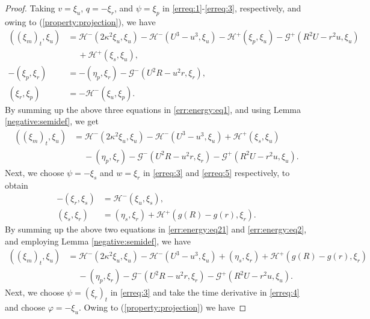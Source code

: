 \documentclass[11pt]{article}
\newcommand{\Hcal} {\mathcal{H}}
\newcommand{\Gcal} {\mathcal{G}}
\numberwithin{equation}{section}
\begin{document}
\begin{proof}
Taking $v=\xi_u$, $q=-\xi_r$, and $\psi=\xi_p$ in \eqref{erreq:1}-\eqref{erreq:3}, respectively, and owing to (\ref{property:projection}), we have
\begin{subequations}\label{err:energy:eq1}
\begin{align}
((\xi_m)_t, \xi_u)&=\Hcal^-(2\kappa^2\xi_u, \xi_u)-\Hcal^-(U^3\!-\!u^3, \xi_u)-\Hcal^+(\xi_p, \xi_u)-\!\Gcal^+(R^2U\!-\!r^2u, \xi_u)\\
&~\quad+\Hcal^+(\xi_s, \xi_u),\nonumber\\
-(\xi_p, \xi_r)&=-(\eta_p, \xi_r)-\Gcal^-(U^2R-u^2r, \xi_r),	\\
(\xi_r, \xi_p)&=-\Hcal^-(\xi_u, \xi_p).
\end{align}
\end{subequations}
By summing up the above three equations in \eqref{err:energy:eq1}, and using Lemma \ref{negative:semidef},  we get
\begin{equation}
	\begin{split}\label{err:energy:eq2}
((\xi_m)_t, \xi_u)&=\Hcal^-(2\kappa^2\xi_u, \xi_u)-\Hcal^-(U^3\!-\!u^3, \xi_u)\!+\Hcal^+(\xi_s, \xi_u)\\
	&~\quad-(\eta_p, \xi_r)-\Gcal^-(U^2R-u^2r, \xi_r)-\!\Gcal^+(R^2U\!-\!r^2u, \xi_u).
\end{split}
\end{equation}
Next, we choose $\psi=-\xi_s$ and $w=\xi_r$ in \eqref{erreq:3} and \eqref{erreq:5} respectively, to obtain
\begin{subequations}\label{err:energy:eq21}
\begin{align}
-(\xi_r, \xi_s)&=\Hcal^-(\xi_u, \xi_s),\\
(\xi_s, \xi_r)&=(\eta_s, \xi_r)+\Hcal^+(g(R)-g(r),\xi_r).
\end{align}
\end{subequations}
By summing up the above two equations in \eqref{err:energy:eq21} and \eqref{err:energy:eq2}, and employing Lemma \ref{negative:semidef}, we have
\begin{equation}
    \begin{split}
((\xi_m)_t, \xi_u)&=\Hcal^-(2\kappa^2\xi_u, \xi_u)-\Hcal^-(U^3\!-\!u^3, \xi_u)\!+(\eta_s,\xi_r)+\Hcal^+(g(R)-g(r),\xi_r)\\
	&~\quad-(\eta_p, \xi_r)-\Gcal^-(U^2R-u^2r, \xi_r)-\!\Gcal^+(R^2U\!-\!r^2u, \xi_u).
\end{split}
\end{equation}
Next, we choose $\psi=(\xi_r)_t$ in \eqref{erreq:3} and take the time derivative in \eqref{erreq:4} and choose $\varphi=-\xi_u$. Owing to (\ref{property:projection}) we have

\end{proof}
\end{document}

